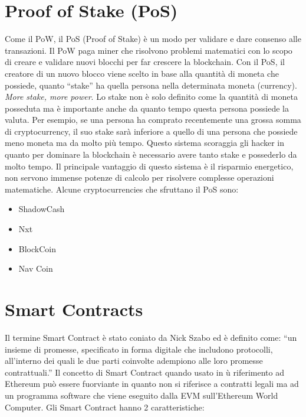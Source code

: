 \section{Proof of Stake (PoS)}
Come il PoW, il PoS (Proof of Stake) è un modo per validare e dare consenso alle
transazioni. Il PoW paga miner che risolvono problemi matematici con lo scopo di
creare e validare nuovi blocchi per far crescere la blockchain.
Con il PoS, il creatore  di un nuovo blocco viene scelto in base alla quantità
di moneta che possiede, quanto ``stake'' ha quella persona nella determinata moneta
(currency). \textit{More stake, more power}.
Lo stake non è solo definito come la quantità di moneta posseduta ma è importante
anche da quanto tempo questa persona possiede la valuta.
Per esempio, se una persona ha comprato recentemente una grossa somma di
cryptocurrency, il suo stake sarà inferiore a quello di una persona che possiede
meno moneta ma da molto più tempo.
Questo sistema scoraggia gli hacker in quanto per dominare la blockchain è
necessario avere tanto stake e possederlo da molto tempo.
Il principale vantaggio di questo sistema è il risparmio energetico,
non servono immense potenze di calcolo per risolvere complesse operazioni matematiche.
Alcune cryptocurrencies che sfruttano il PoS sono:

\vspace{-0.5em}

\begin{itemize}
      \item ShadowCash
      \item Nxt
      \item BlockCoin
      \item Nav Coin
\end{itemize}

\vspace{-1em}

\section{Smart Contracts}

Il termine Smart Contract è stato coniato da Nick Szabo ed è definito come: ``un insieme di promesse, specificato in forma digitale che includono protocolli, all'interno dei quali le due parti coinvolte adempiono alle loro promesse contrattuali.''
Il concetto di Smart Contract quando usato in ù riferimento ad Ethereum può essere fuorviante in quanto
non si riferisce a contratti legali ma ad un programma software che viene eseguito dalla EVM sull'Ethereum
World Computer. Gli Smart Contract hanno 2 caratteristiche:

